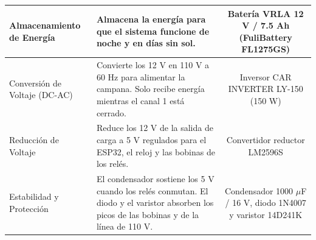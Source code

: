 \documentclass[12pt,letterpaper]{article}
\begin{document}
{\begin{tabular}{|A|B|C|}
\hline
Almacenamiento de Energía & Almacena la energía para que el sistema funcione de noche y en días sin sol. & Batería VRLA 12 V / 7.5 Ah (FuliBattery FL1275GS) \\
\hline
Conversión de Voltaje (DC-AC) & Convierte los 12 V en 110 V a 60 Hz para alimentar la campana. Solo recibe energía mientras el canal 1 está cerrado. & Inversor CAR INVERTER LY-150 (150 W) \\
\hline
Reducción de Voltaje & Reduce los 12 V de la salida de carga a 5 V regulados para el ESP32, el reloj y las bobinas de los relés. & Convertidor reductor LM2596S \\
\hline
Estabilidad y Protección & El condensador sostiene los 5 V cuando los relés conmutan. El diodo y el varistor absorben los picos de las bobinas y de la línea de 110 V. & Condensador 1000 $\mu$F / 16 V, diodo 1N4007 y varistor 14D241K \\
\hline
\end{tabular}}

\newpage
\end{document}
